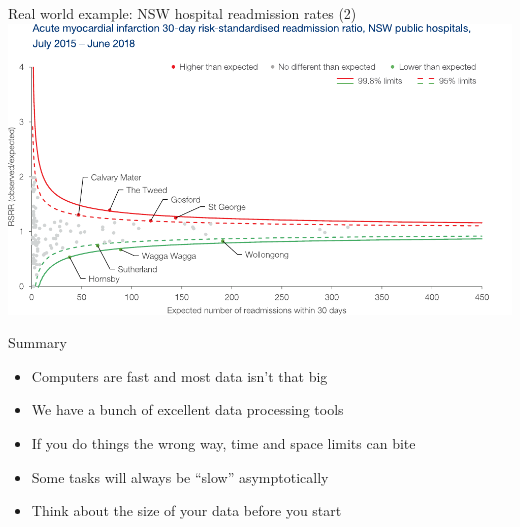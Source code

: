 \documentclass[aspectratio=169,12pt,usepdftitle=false]{beamer} %
\begin{document}
\begin{frame}{Real world example: NSW hospital readmission rates (2)}
\centering
\includegraphics[height=0.8\textheight]
	{ref/ami-rsrr.pdf}


\end{frame}

\begin{frame}{Summary}
    \begin{itemize}
	\item Computers are fast and most data isn't that big
	\item We have a bunch of excellent data processing tools
	\item If you do things the wrong way, time and space limits can bite
	\item Some tasks will always be ``slow'' asymptotically
	\item Think about the size of your data before you start
    \end{itemize}
\end{frame}

%
%
%
%





\end{document}
